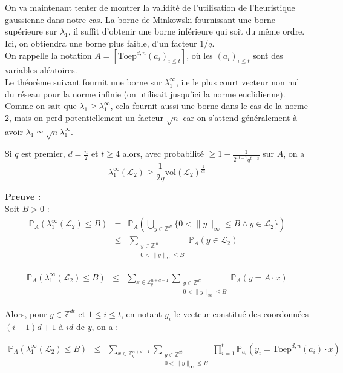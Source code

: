 \documentclass[11pt,a4paper]{article}
\begin{document}
On va maintenant tenter de montrer la validité de l'utilisation de l'heuristique gaussienne dans notre cas. La borne de Minkowski fournissant une borne supérieure sur $\lambda_1$, il suffit d'obtenir une borne inférieure qui soit du même ordre. Ici, on obtiendra une borne plus faible, d'un facteur $1/q$.  \\ On rappelle la notation $A=[\text{Toep}^{d,n}(a_i)_{i\leq t}]$, où les $(a_i)_{i\leq t}$ sont des variables aléatoires. \\ Le théorème suivant fournit une borne sur $\lambda_1^\infty$, i.e le plus court vecteur non nul du réseau pour la norme infinie (on utilisait jusqu'ici la norme euclidienne). Comme on sait que $\lambda_1 \geq \lambda_1^\infty$, cela fournit aussi une borne dans le cas de la norme 2, mais on perd potentiellement un facteur $\sqrt{n}$ car on s'attend généralement à avoir  $\lambda_1 \simeq \sqrt{n} \lambda_1^\infty$.

\begin{theorem} Si $q$ est premier, $d=\frac{n}{2}$ et $t\geq 4$ alors, avec probabilité $\displaystyle \geq 1-\frac{1}{2^{td-1}q^{t-3}}$ sur $A$, on a \[\lambda_1^\infty(\mathcal{L}_2) \geq \frac{1}{2q} \text{vol}(\mathcal{L}_2)^{\frac{1}{dt}}\]
\end{theorem}

\textbf{Preuve :} \\
Soit $B > 0$ :
\begin{eqnarray*}
\mathbb{P}_A(\lambda_1^\infty(\mathcal{L}_2) \leq B) &=& \mathbb{P}_A( \bigcup_{y\in \mathbb{Z}^{dt}} \{0 < \|y\|_\infty \leq B \land y \in \mathcal{L}_2 \} ) \\
&\leq& \sum_{\substack{y \in \mathbb{Z}^{dt} \\ 0 < \|y\|_\infty \leq B}} \mathbb{P}_A(y \in \mathcal{L}_2) 
\end{eqnarray*}


\begin{eqnarray*}
\mathbb{P}_A(\lambda_1^\infty(\mathcal{L}_2) \leq B) &\leq&  \sum_{x \in \mathbb{Z}_q^{n+d-1}} \sum_{\substack{y \in \mathbb{Z}^{dt} \\ 0 < \|y\|_\infty \leq B}} \mathbb{P}_A(y=A\cdot x) 
\end{eqnarray*}

Alors, pour $y \in \mathbb{Z}^{dt}$ et $1 \leq i \leq t$, en notant $y_i$ le vecteur constitué des coordonnées $(i-1)d+1$ à $id$ de $y$, on a : 

\begin{eqnarray*}
\mathbb{P}_A(\lambda_1^\infty(\mathcal{L}_2) \leq B) &\leq& \sum_{x \in \mathbb{Z}_q^{n+d-1}} \sum_{\substack{y \in \mathbb{Z}^{dt} \\ 0 < \|y\|_\infty \leq B}} \prod_{i=1}^t \mathbb{P}_{a_i}(y_i =\text{Toep}^{d,n}(a_i) \cdot  x)
\end{eqnarray*}
\end{document}
